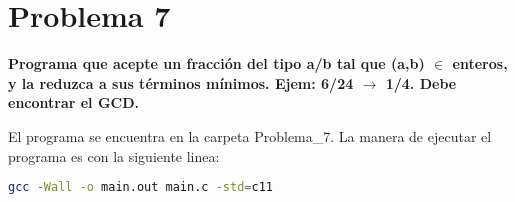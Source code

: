 \section*{Problema 7}
\textbf{Programa que acepte un fracción del tipo a/b tal que (a,b) $\in$ enteros, y la reduzca a sus términos mínimos. Ejem: 6/24 $\rightarrow$ 1/4. Debe encontrar el GCD.}

El programa se encuentra en la carpeta \textcolor{citecolor}{Problema\_7}. La manera de ejecutar el programa es con la siguiente linea:
\begin{lstlisting}[language=bash]
    gcc -Wall -o main.out main.c -std=c11
\end{lstlisting}